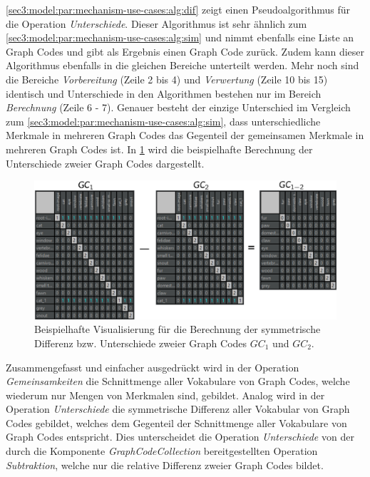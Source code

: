 

\cref{sec3:model:par:mechanism-use-cases:alg:dif} zeigt einen Pseudoalgorithmus für die Operation \textit{Unterschiede}.
Dieser Algorithmus ist sehr ähnlich zum \cref{sec3:model:par:mechanism-use-cases:alg:sim} und nimmt ebenfalls eine Liste an Graph Codes und gibt als Ergebnis einen Graph Code zurück.
Zudem kann dieser Algorithmus ebenfalls in die gleichen Bereiche unterteilt werden.
Mehr noch sind die Bereiche \textit{Vorbereitung} (Zeile 2 bis 4) und \textit{Verwertung} (Zeile 10 bis 15) identisch und Unterschiede in den Algorithmen bestehen nur im Bereich \textit{Berechnung} (Zeile 6 - 7).
Genauer besteht der einzige Unterschied im Vergleich zum \cref{sec3:model:par:mechanism-use-cases:alg:sim}, dass unterschiedliche Merkmale in mehreren Graph Codes das Gegenteil der gemeinsamen Merkmale in mehreren Graph Codes ist.
In \cref{sec3:model:par:mechanism-use-cases:fig:gc1-2-differences} wird die beispielhafte Berechnung der Unterschiede zweier Graph Codes dargestellt.

\begin{figure}[!ht]
  \centering
  \includegraphics{chapter/chapter_3/algorithms/gc1-2-differences-ex}
  \caption{Beispielhafte Visualisierung für die Berechnung der symmetrische Differenz bzw. Unterschiede zweier Graph Codes $GC_1$ und $GC_2$.}
  \label{sec3:model:par:mechanism-use-cases:fig:gc1-2-differences}
\end{figure}

Zusammengefasst und einfacher ausgedrückt wird in der Operation \textit{Gemeinsamkeiten} die Schnittmenge aller Vokabulare von Graph Codes, welche wiederum nur Mengen von Merkmalen sind, gebildet.
Analog wird in der Operation \textit{Unterschiede} die symmetrische Differenz aller Vokabular von Graph Codes gebildet, welches dem Gegenteil der Schnittmenge aller Vokabulare von Graph Codes entspricht.
Dies unterscheidet die Operation \textit{Unterschiede} von der durch die Komponente \textit{GraphCodeCollection} bereitgestellten Operation \textit{Subtraktion}, welche nur die relative Differenz zweier Graph Codes bildet.

